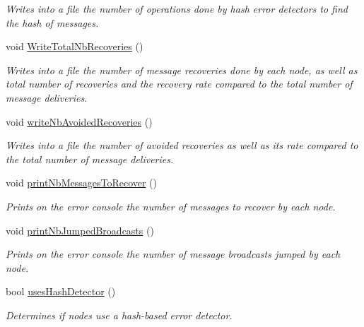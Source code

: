 \begin{DoxyCompactItemize}
\begin{DoxyCompactList}\small\item\em Writes into a file the number of operations done by hash error detectors to find the hash of messages. \end{DoxyCompactList}\item 
void \hyperlink{class_stats_a75689d1481b0605ce74d775e36c21740}{Write\+Total\+Nb\+Recoveries} ()
\begin{DoxyCompactList}\small\item\em Writes into a file the number of message recoveries done by each node, as well as total number of recoveries and the recovery rate compared to the total number of message deliveries. \end{DoxyCompactList}\item 
void \hyperlink{class_stats_ac6a0fdf44cc2a3dc11ff22eb75faacf2}{write\+Nb\+Avoided\+Recoveries} ()
\begin{DoxyCompactList}\small\item\em Writes into a file the number of avoided recoveries as well as its rate compared to the total number of message deliveries. \end{DoxyCompactList}\item 
void \hyperlink{class_stats_ae2c59851f26885a62c2e65fda16d47ee}{print\+Nb\+Messages\+To\+Recover} ()
\begin{DoxyCompactList}\small\item\em Prints on the error console the number of messages to recover by each node. \end{DoxyCompactList}\item 
void \hyperlink{class_stats_aaba10264a569b9240a300ddc341e6a8c}{print\+Nb\+Jumped\+Broadcasts} ()
\begin{DoxyCompactList}\small\item\em Prints on the error console the number of message broadcasts jumped by each node. \end{DoxyCompactList}\item 
bool \hyperlink{class_stats_a509d8e8fba4312eeffe2c6cee722f30f}{uses\+Hash\+Detector} ()
\begin{DoxyCompactList}\small\item\em Determines if nodes use a hash-\/based error detector. \end{DoxyCompactList}\end{DoxyCompactItemize}
